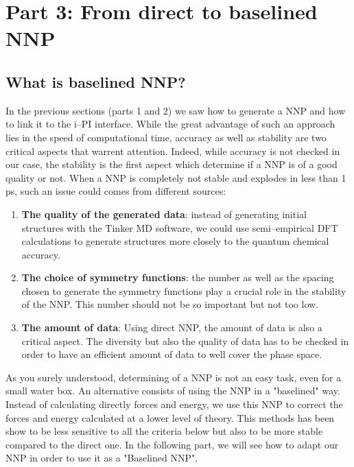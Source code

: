 \documentclass[12pt]{article}
\begin{document}
\section{Part 3: From direct to baselined NNP}
%
\subsection{What is baselined NNP?}
In the previous sections (parts 1 and 2) we saw how to generate a NNP and how to link it to the i--PI interface. While the great advantage of such an approach lies in the speed of computational time, accuracy as well as stability are two critical aspects that warrent attention. Indeed, while accuracy is not checked in our case, the stability is the first aspect which determine if a NNP is of a good quality or not. When a NNP is completely not stable and explodes in less than 1 ps, such an issue could comes from different sources:
\begin{enumerate}
    \item \textbf{The quality of the generated data}: instead of generating initial structures with the Tinker MD software, we could use semi--empirical DFT calculations to generate structures more closely to the quantum chemical accuracy. 
    \item \textbf{The choice of symmetry functions}: the number as well as the spacing chosen to generate the symmetry functions play a crucial role in the stability of the NNP. This number should not be so important but not too low. 
    \item \textbf{The amount of data}: Using direct NNP, the amount of data is also a critical aspect. The diversity but also the quality of data has to be checked in order to have an efficient amount of data to well cover the phase space.
\end{enumerate}
As you surely understood, determining of a NNP is not an easy task, even for a small water box. An alternative consists of using the NNP in a "baselined" way. Instead of calculating directly forces and energy, we use this NNP to correct the forces and energy calculated at a lower level of theory. This methods has been show to be less sensitive to all the criteria below but also to be more stable compared to the direct one. In the following part, we will see how to adapt our NNP in order to use it as a "Baselined NNP". 
%
\end{document}
